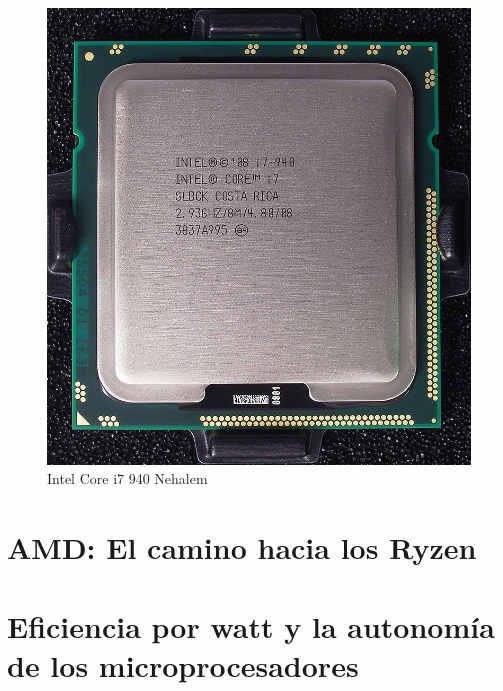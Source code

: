 \begin{figure}[htb]
	\centering
	\includegraphics[scale = 0.2]{Graphics/Intel_core_i7_940_top_R7309478_wp.jpg}
	\caption{Intel Core i7 940  Nehalem}
	\label{fig:25}
\end{figure}

\section{AMD: El camino hacia los Ryzen}
\section{Eficiencia por watt y la autonomía de los microprocesadores}
